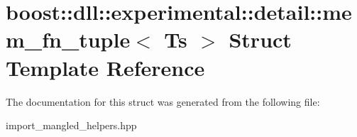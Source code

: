 \hypertarget{a00220}{}\section{boost\+:\+:dll\+:\+:experimental\+:\+:detail\+:\+:mem\+\_\+fn\+\_\+tuple$<$ Ts $>$ Struct Template Reference}
\label{a00220}


The documentation for this struct was generated from the following file\+:\begin{DoxyCompactItemize}
\item 
import\+\_\+mangled\+\_\+helpers.\+hpp\end{DoxyCompactItemize}
